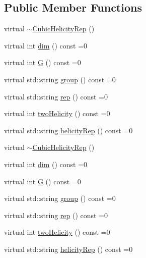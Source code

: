 \subsection*{Public Member Functions}
\begin{DoxyCompactItemize}
\item 
virtual \mbox{\hyperlink{structHadron_1_1CubicHelicityRep_a8ac31a49aff79450f4505e20fc8b6b15}{$\sim$\+Cubic\+Helicity\+Rep}} ()
\item 
virtual int \mbox{\hyperlink{structHadron_1_1CubicHelicityRep_a95d229a05580e65f8bdde74a1e316855}{dim}} () const =0
\item 
virtual int \mbox{\hyperlink{structHadron_1_1CubicHelicityRep_a50689f42be1e6170aa8cf6ad0597018b}{G}} () const =0
\item 
virtual std\+::string \mbox{\hyperlink{structHadron_1_1CubicHelicityRep_a101a7d76cd8ccdad0f272db44b766113}{group}} () const =0
\item 
virtual std\+::string \mbox{\hyperlink{structHadron_1_1CubicHelicityRep_a8cdd86f068a167dc96faef02bfb8a33d}{rep}} () const =0
\item 
virtual int \mbox{\hyperlink{structHadron_1_1CubicHelicityRep_af507aa56fc2747eacc8cb6c96db31ecc}{two\+Helicity}} () const =0
\item 
virtual std\+::string \mbox{\hyperlink{structHadron_1_1CubicHelicityRep_af1096946b7470edf0a55451cc662f231}{helicity\+Rep}} () const =0
\item 
virtual \mbox{\hyperlink{structHadron_1_1CubicHelicityRep_a8ac31a49aff79450f4505e20fc8b6b15}{$\sim$\+Cubic\+Helicity\+Rep}} ()
\item 
virtual int \mbox{\hyperlink{structHadron_1_1CubicHelicityRep_a95d229a05580e65f8bdde74a1e316855}{dim}} () const =0
\item 
virtual int \mbox{\hyperlink{structHadron_1_1CubicHelicityRep_a50689f42be1e6170aa8cf6ad0597018b}{G}} () const =0
\item 
virtual std\+::string \mbox{\hyperlink{structHadron_1_1CubicHelicityRep_a101a7d76cd8ccdad0f272db44b766113}{group}} () const =0
\item 
virtual std\+::string \mbox{\hyperlink{structHadron_1_1CubicHelicityRep_a8cdd86f068a167dc96faef02bfb8a33d}{rep}} () const =0
\item 
virtual int \mbox{\hyperlink{structHadron_1_1CubicHelicityRep_af507aa56fc2747eacc8cb6c96db31ecc}{two\+Helicity}} () const =0
\item 
virtual std\+::string \mbox{\hyperlink{structHadron_1_1CubicHelicityRep_af1096946b7470edf0a55451cc662f231}{helicity\+Rep}} () const =0

\end{DoxyCompactItemize}
